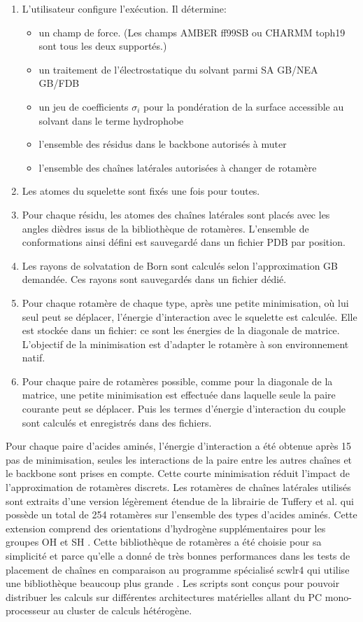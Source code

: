 \begin{enumerate}[leftmargin=*]
\item L'utilisateur configure l'exécution. Il détermine:
\begin{itemize}
\item un champ de force. (Les champs AMBER ff99SB ou CHARMM toph19 sont tous les deux supportés.)
\item un traitement de l'électrostatique du solvant parmi SA GB/NEA GB/FDB
\item un jeu de coefficients $\sigma_i$ pour la pondération de la surface accessible au solvant dans le terme hydrophobe
\item l'ensemble des résidus dans le backbone autorisés à muter
\item l'ensemble des chaînes latérales autorisées à changer de rotamère 
\end{itemize}
\item Les atomes du squelette sont fixés une fois pour toutes.
\item Pour chaque résidu, les atomes des chaînes latérales sont placés avec les angles dièdres issus de la bibliothèque de rotamères. L'ensemble de conformations ainsi défini est sauvegardé dans un fichier PDB par position.
\item Les rayons de solvatation de Born sont calculés selon l'approximation GB demandée. Ces rayons sont sauvegardés dans un fichier dédié.
\item Pour chaque rotamère de chaque type, après une petite minimisation, où lui seul peut se déplacer, l'énergie d'interaction avec le squelette est calculée. Elle est stockée dans un fichier: ce sont les énergies de la diagonale de matrice. L'objectif de la minimisation est d'adapter le rotamère à son environnement natif.
\item Pour chaque paire de rotamères possible, comme pour la diagonale de la matrice, une petite minimisation est effectuée dans laquelle seule la paire courante peut se déplacer. Puis les termes d'énergie d'interaction du couple sont calculés et enregistrés dans des fichiers.  
\end{enumerate}

Pour chaque paire d'acides aminés, l'énergie d'interaction a été obtenue après 15 pas de minimisation, seules les interactions de la paire entre les autres chaînes et le backbone sont prises en compte. Cette courte minimisation réduit l'impact de l'approximation de rotamères discrets. Les rotamères de chaînes latérales utilisés sont extraits d'une version légèrement étendue de la librairie de Tuffery et al. \cite{Tuffery91} qui possède un total de 254 rotamères sur l'ensemble des types d'acides aminés. Cette extension comprend des orientations d'hydrogène supplémentaires pour les groupes OH et SH \cite{Gaillard14}. Cette bibliothèque de rotamères a été choisie pour sa simplicité et parce qu'elle a donné de très bonnes performances dans les tests de placement de chaînes en comparaison au programme spécialisé scwlr4 qui utilise une bibliothèque beaucoup plus grande \cite{Krivov09,Gaillard16}. Les scripts sont conçus pour pouvoir distribuer les calculs sur différentes architectures matérielles allant du PC mono-processeur au cluster de calculs hétérogène.

